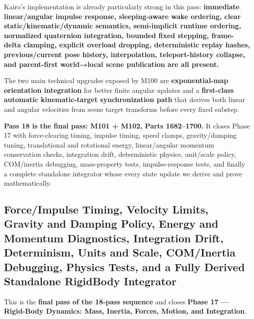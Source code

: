Kairo's implementation is already particularly strong in this pass: \textbf{immediate linear/angular impulse response, sleeping-aware wake ordering, clear static/kinematic/dynamic semantics, semi-implicit runtime ordering, normalized quaternion integration, bounded fixed stepping, frame-delta clamping, explicit overload dropping, deterministic replay hashes, previous/current pose history, interpolation, teleport-history collapse, and parent-first world→local scene publication are all present.}

The two main technical upgrades exposed by M100 are \textbf{exponential-map orientation integration} for better finite angular updates and a \textbf{first-class automatic kinematic-target synchronization path} that derives both linear and angular velocities from scene target transforms before every fixed substep.

\textbf{Pass 18 is the final pass: M101 + M102, Parts 1682--1700.} It closes Phase 17 with force-clearing timing, impulse timing, speed clamps, gravity/damping tuning, translational and rotational energy, linear/angular momentum conservation checks, integration drift, deterministic physics, unit/scale policy, COM/inertia debugging, mass-property tests, impulse-response tests, and finally a complete standalone  integrator whose every state update we derive and prove mathematically.

\subsection{Force/Impulse Timing, Velocity Limits, Gravity and Damping Policy, Energy and Momentum Diagnostics, Integration Drift, Determinism, Units and Scale, COM/Inertia Debugging, Physics Tests, and a Fully Derived Standalone RigidBody Integrator}\label{06-engine-ii-ch038-forceimpulse-timing-velocity-limits-gravity-and-damping-policy-energy-and-momentum-diagnostics-integration-drift-determinism-units-and-scale-cominertia-debugging-physics-tests-and-a-fully-derived-standalone-rigidbody-integrator}

\hypertarget{06-engine-ii-ch038-forceimpulse-timing-velocity-limits-gravity-and-damping-policy-energy-and-momentum-diagnostics-integration-drift-determinism-units-and-scale-cominertia-debugging-physics-tests-and-a-fully-derived-standalone-rigidbody-integrator}{}

This is the \textbf{final pass of the 18-pass sequence} and closes \textbf{Phase 17 --- Rigid-Body Dynamics: Mass, Inertia, Forces, Motion, and Integration}.

